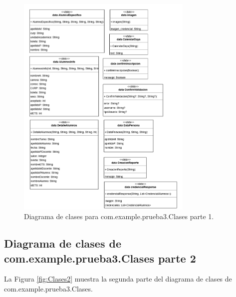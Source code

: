 \begin{figure}[htbp!]
	\begin{center}
		\includegraphics[width=0.75\textwidth]{DiagramasMoviles/DCM (2)}
		\caption{Diagrama de clases para com.example.prueba3.Clases parte 1.}
		\label{fig:Clases1}
	\end{center}
\end{figure}

\newpage

\subsection{Diagrama de clases de com.example.prueba3.Clases parte 2}

La Figura \ref{fig:Clases2} muestra la segunda parte del diagrama de clases de com.example.prueba3.Clases.

